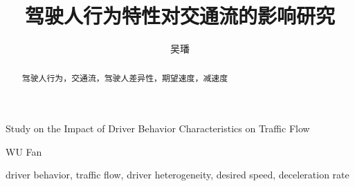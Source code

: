\documentclass[unicode,master,printedition]{seuthesis} %
\begin{document}
\title{驾驶人行为特性对交通流的影响研究}{}{Study on the Impact of Driver Behavior Characteristics on Traffic Flow}{}
\author{吴\quad{}璠}{WU Fan}
\authorizedate{}
\maketitle

\begin{abstract}{驾驶人行为，交通流，驾驶人差异性，期望速度，减速度}

\end{abstract}

\begin{englishabstract}{driver behavior, traffic flow, driver heterogeneity, desired speed, deceleration rate}

\end{englishabstract}


\begin{Main} %

%







\end{Main} %
\end{document}
